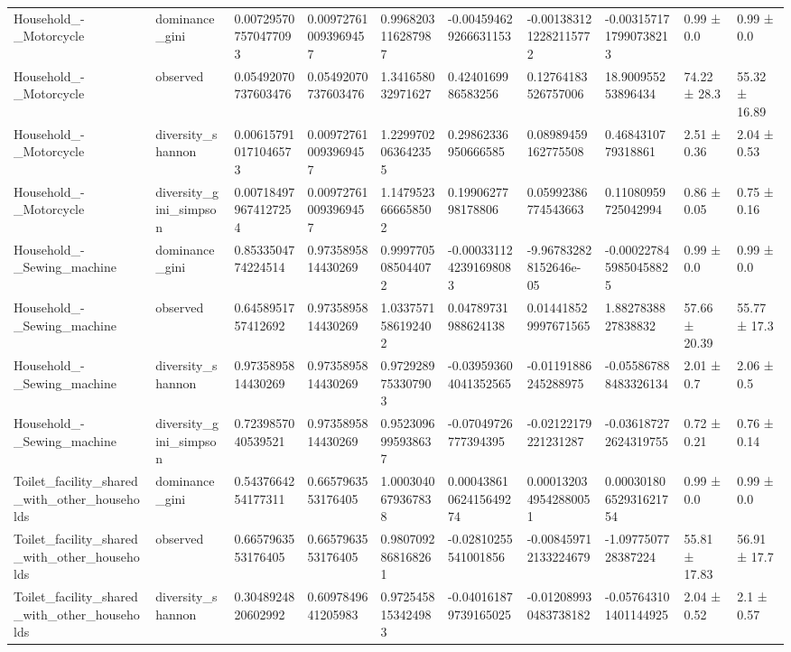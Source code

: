 \begin{longtable}{llllllllll}
Household\_-\_Motorcycle & dominance\_gini & 0.007295707570477093 & 0.009727610093969457 & 0.9968203116287987 & -0.004594629266631153 & -0.0013831212282115772 & -0.0031571717990738213 & 0.99 ± 0.0 & 0.99 ± 0.0 \\
Household\_-\_Motorcycle & observed & 0.05492070737603476 & 0.05492070737603476 & 1.341658032971627 & 0.4240169986583256 & 0.12764183526757006 & 18.900955253896434 & 74.22 ± 28.3 & 55.32 ± 16.89 \\
Household\_-\_Motorcycle & diversity\_shannon & 0.006157910171046573 & 0.009727610093969457 & 1.2299702063642355 & 0.29862336950666585 & 0.08989459162775508 & 0.4684310779318861 & 2.51 ± 0.36 & 2.04 ± 0.53 \\
Household\_-\_Motorcycle & diversity\_gini\_simpson & 0.007184979674127254 & 0.009727610093969457 & 1.1479523666658502 & 0.1990627798178806 & 0.05992386774543663 & 0.11080959725042994 & 0.86 ± 0.05 & 0.75 ± 0.16 \\
Household\_-\_Sewing\_machine & dominance\_gini & 0.8533504774224514 & 0.9735895814430269 & 0.9997705085044072 & -0.0003311242391698083 & -9.967832828152646e-05 & -0.0002278459850458825 & 0.99 ± 0.0 & 0.99 ± 0.0 \\
Household\_-\_Sewing\_machine & observed & 0.6458951757412692 & 0.9735895814430269 & 1.0337571586192402 & 0.04789731988624138 & 0.014418529997671565 & 1.8827838827838832 & 57.66 ± 20.39 & 55.77 ± 17.3 \\
Household\_-\_Sewing\_machine & diversity\_shannon & 0.9735895814430269 & 0.9735895814430269 & 0.9729289753307903 & -0.039593604041352565 & -0.01191886245288975 & -0.055867888483326134 & 2.01 ± 0.7 & 2.06 ± 0.5 \\
Household\_-\_Sewing\_machine & diversity\_gini\_simpson & 0.7239857040539521 & 0.9735895814430269 & 0.9523096995938637 & -0.07049726777394395 & -0.02122179221231287 & -0.036187272624319755 & 0.72 ± 0.21 & 0.76 ± 0.14 \\
Toilet\_facility\_shared\_with\_other\_households & dominance\_gini & 0.5437664254177311 & 0.6657963553176405 & 1.0003040679367838 & 0.00043861062415649274 & 0.0001320349542880051 & 0.00030180652931621754 & 0.99 ± 0.0 & 0.99 ± 0.0 \\
Toilet\_facility\_shared\_with\_other\_households & observed & 0.6657963553176405 & 0.6657963553176405 & 0.9807092868168261 & -0.02810255541001856 & -0.008459712133224679 & -1.0977507728387224 & 55.81 ± 17.83 & 56.91 ± 17.7 \\
Toilet\_facility\_shared\_with\_other\_households & diversity\_shannon & 0.3048924820602992 & 0.6097849641205983 & 0.9725458153424983 & -0.040161879739165025 & -0.012089930483738182 & -0.057643101401144925 & 2.04 ± 0.52 & 2.1 ± 0.57 \\

\end{longtable}
